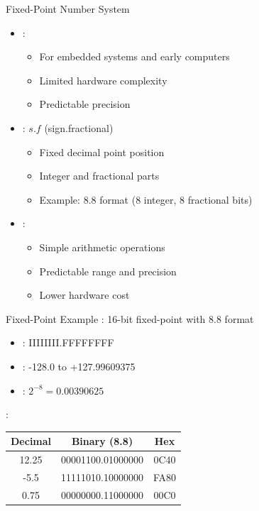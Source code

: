 \begin{frame}{Fixed-Point Number System}
\begin{itemize}
\item {}:
\begin{itemize}
\item For embedded systems and early computers
\item Limited hardware complexity
\item Predictable precision
\end{itemize}
\vspace{0.5cm}
\item {}: $s.f$ (sign.fractional)
\begin{itemize}
\item Fixed decimal point position
\item Integer and fractional parts
\item Example: 8.8 format (8 integer, 8 fractional bits)
\end{itemize}
\vspace{0.3cm}
\item {}:
\begin{itemize}
\item Simple arithmetic operations
\item Predictable range and precision
\item Lower hardware cost
\end{itemize}
\end{itemize}
\end{frame}

\begin{frame}{Fixed-Point Example}
: 16-bit fixed-point with 8.8 format

\vspace{0.3cm}
\begin{itemize}
\item {}: IIIIIIII.FFFFFFFF
\item {}: -128.0 to +127.99609375
\item {}: $2^{-8} = 0.00390625$
\end{itemize}

\vspace{0.5cm}
:
\begin{center}
\begin{tabular}{|c|c|c|}
\hline
\textbf{Decimal} & \textbf{Binary (8.8)} & \textbf{Hex} \\
\hline
12.25 & 00001100.01000000 & 0C40 \\
-5.5 & 11111010.10000000 & FA80 \\
0.75 & 00000000.11000000 & 00C0 \\
\hline
\end{tabular}
\end{center}
\end{frame}

